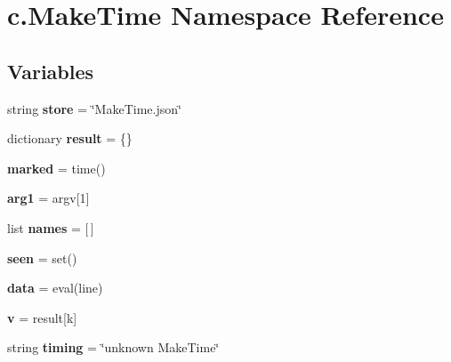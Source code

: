 \hypertarget{namespacec_1_1_make_time}{}\section{c.\+Make\+Time Namespace Reference}
\label{namespacec_1_1_make_time}
\subsection*{Variables}
\begin{DoxyCompactItemize}
\item 
string {\bfseries store} = \char`\"{}Make\+Time.\+json\char`\"{}\hypertarget{namespacec_1_1_make_time_a6b0330fd18e2afbe9403b9f33998b344}{}\label{namespacec_1_1_make_time_a6b0330fd18e2afbe9403b9f33998b344}

\item 
dictionary {\bfseries result} = \{\}\hypertarget{namespacec_1_1_make_time_a9d5db951ea94d034d28051f01d1ea0a8}{}\label{namespacec_1_1_make_time_a9d5db951ea94d034d28051f01d1ea0a8}

\item 
{\bfseries marked} = time()\hypertarget{namespacec_1_1_make_time_a308a68a775262f6855bc2ed6570688e0}{}\label{namespacec_1_1_make_time_a308a68a775262f6855bc2ed6570688e0}

\item 
{\bfseries arg1} = argv\mbox{[}1\mbox{]}\hypertarget{namespacec_1_1_make_time_ad452d6c95449deb52683b1a4b7acdb5f}{}\label{namespacec_1_1_make_time_ad452d6c95449deb52683b1a4b7acdb5f}

\item 
list {\bfseries names} = \mbox{[}$\,$\mbox{]}\hypertarget{namespacec_1_1_make_time_a6d5b36056d1e962520e7fa46ac85e475}{}\label{namespacec_1_1_make_time_a6d5b36056d1e962520e7fa46ac85e475}

\item 
{\bfseries seen} = set()\hypertarget{namespacec_1_1_make_time_a9e7143b91c7e7b2615545c0515ed8703}{}\label{namespacec_1_1_make_time_a9e7143b91c7e7b2615545c0515ed8703}

\item 
{\bfseries data} = eval(line)\hypertarget{namespacec_1_1_make_time_accbce86165d3ec19ad823acfcfbf6b5f}{}\label{namespacec_1_1_make_time_accbce86165d3ec19ad823acfcfbf6b5f}

\item 
{\bfseries v} = result\mbox{[}k\mbox{]}\hypertarget{namespacec_1_1_make_time_a6cc291db716c8921cf59b9b1b62c023c}{}\label{namespacec_1_1_make_time_a6cc291db716c8921cf59b9b1b62c023c}

\item 
string {\bfseries timing} = \char`\"{}unknown Make\+Time\char`\"{}\hypertarget{namespacec_1_1_make_time_a217479927b217fb07878912415f01efb}{}\label{namespacec_1_1_make_time_a217479927b217fb07878912415f01efb}

\end{DoxyCompactItemize}


